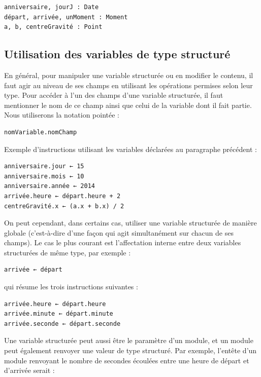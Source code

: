 \documentclass[11pt,a4paper]{article}
\begin{document}
            \par
        \begin{verbatim}
anniversaire, jourJ : Date
départ, arrivée, unMoment : Moment
a, b, centreGravité : Point
      \end{verbatim}\subsection{Utilisation des variables de type structur\'e}
		    En g\'en\'eral, pour manipuler une variable structur\'ee ou en modifier le contenu, il faut agir
        au niveau de ses champs en utilisant les op\'erations permises selon leur type. Pour acc\'eder \`a
        l'un des champs d'une variable structur\'ee, il faut mentionner le nom de ce champ ainsi que
        celui de la variable dont il fait partie. Nous utiliserons la notation \guillemotleft  point\'ee \guillemotright  :
      
            \par
        \begin{verbatim}
nomVariable.nomChamp
      \end{verbatim}
		    Exemple d'instructions utilisant les variables d\'eclar\'ees au paragraphe pr\'ec\'edent :
      
            \par
        \begin{verbatim}
anniversaire.jour ← 15
anniversaire.mois ← 10
anniversaire.année ← 2014
arrivée.heure ← départ.heure + 2
centreGravité.x ← (a.x + b.x) / 2
      \end{verbatim}
		    On peut cependant, dans certains cas, utiliser une variable structur\'ee de mani\`ere globale
        (c'est-\`a-dire d'une fa\c con qui agit simultan\'ement sur chacun de ses champs). Le cas le plus
        courant est l'affectation interne entre deux variables structur\'ees de m\^eme type, par exemple :
      
            \par
        \begin{verbatim}
arrivée ← départ
      \end{verbatim}
		    qui r\'esume les trois instructions suivantes :
      
            \par
        \begin{verbatim}
arrivée.heure ← départ.heure
arrivée.minute ← départ.minute
arrivée.seconde ← départ.seconde
      \end{verbatim}
		    Une variable structur\'ee peut aussi \^etre le param\`etre d'un module, et un module peut \'egalement 
		    renvoyer une \guillemotleft  valeur \guillemotright  de type structur\'e. Par exemple, l'ent\^ete d'un module renvoyant
		    le nombre de secondes \'ecoul\'ees entre une heure de d\'epart et d'arriv\'ee serait :
      
\end{document}
